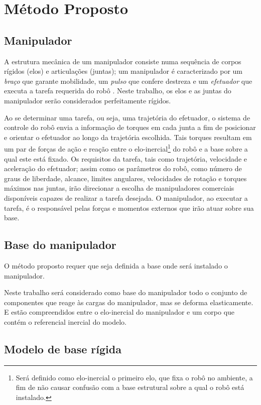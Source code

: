 \chapter{Método Proposto}

\section{Manipulador}

A estrutura mecânica de um manipulador consiste numa sequência de
corpos rígidos (elos) e articulações (juntas); um manipulador é caracterizado
por um \textit{braço} que garante mobilidade, um \textit{pulso} que confere
destreza e um \textit{efetuador} que executa a tarefa requerida do robô
\cite{Siciliano2009}.
Neste trabalho, os elos e as juntas do manipulador serão considerados
perfeitamente rígidos. 

Ao se determinar uma tarefa, ou seja, uma trajetória do efetuador, o sistema
de controle do robô envia a informação de torques em cada junta a fim de
posicionar e orientar o efetuador ao longo da trajetória escolhida. Tais
torques resultam em um par de forças de ação e reação entre o
elo-inercial\footnote{Será definido como elo-inercial o primeiro elo, que
fixa o robô no ambiente, a fim de não causar confusão com a base estrutural
sobre a qual o robô está instalado.} do robô e a base sobre a qual este está fixado.
Os requisitos da tarefa, tais como trajetória, velocidade e aceleração do
efetuador; assim como os parâmetros do robô, como número de graus de
liberdade, alcance, limites angulares, velocidades de rotação e torques máximos
nas juntas, irão direcionar a escolha de manipuladores comerciais disponíveis
capazes de realizar a tarefa desejada. O manipulador, ao executar a
tarefa, é o responsável pelas forças e momentos externos que irão atuar sobre
sua base.

\section{Base do manipulador}

O método proposto requer que seja definida a base onde será instalado o
manipulador. 

Neste trabalho será considerado como base do manipulador todo o conjunto de
componentes que reage às cargas do manipulador, mas se deforma elasticamente.
E estão compreendidos entre o elo-inercial do manipulador e um corpo que
contém o referencial inercial do modelo.

\section{Modelo de base rígida}

